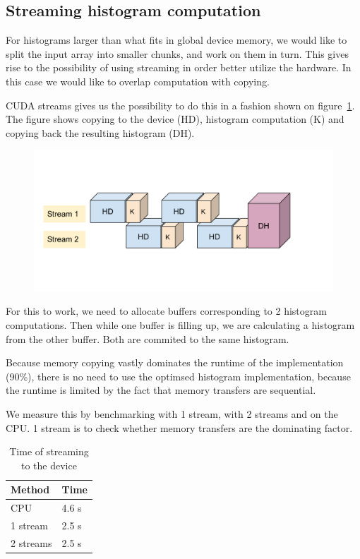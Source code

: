 \documentclass[12pt, a4paper, hidelinks]{article}
\begin{document}
\subsection{Streaming histogram computation}
For histograms larger than what fits in global device memory, we would like to split
the input array into smaller chunks, and work on them in turn.
This gives rise to the possibility of using streaming in order better utilize the hardware.
In this case we would like to overlap computation with copying.

CUDA streams gives us the possibility to do this in a fashion shown on figure~\ref{fig:cuda-stream}.
The figure shows copying to the device (HD),
histogram computation (K) and copying back the resulting histogram (DH).

\begin{figure}[htpb]
    \centering
    \includegraphics[width=0.8\linewidth]{img/cuda-stream.pdf}
    \label{fig:cuda-stream}
\end{figure}

For this to work, we need to allocate buffers corresponding to 2 histogram computations.
Then while one buffer is filling up, we are calculating a histogram from the other
buffer. Both are commited to the same histogram.

Because memory copying vastly dominates the runtime of the implementation (90\%),
there is no need to use the optimsed histogram implementation, because the runtime
is limited by the fact that memory transfers are sequential.

We measure this by benchmarking with 1 stream, with 2 streams and on the CPU. 1 stream
is to check whether memory transfers are the dominating factor.

\begin{table}[htpb]
    \centering
    \begin{tabular}{l l}
        Method & Time \\
        \hline
        CPU & 4.6 s \\
        1 stream  & 2.5 s \\
        2 streams & 2.5 s \\
        \hline
    \end{tabular}
    \caption{Time of streaming to the device}
    \label{tab:stream}
\end{table}
\end{document}
